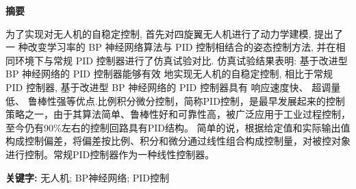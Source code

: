 \renewcommand{\abstractname}{摘要}  %
\begin{center}
   \large{\textbf{摘要}}
\end{center}
\begin{adjustwidth}{0cm}{0cm}
   \hspace{2em}为了实现对无人机的自稳定控制, 首先对四旋翼无人机进行了动力学建模, 提出了一
   种改变学习率的 BP 神经网络算法与 PID 控制相结合的姿态控制方法, 并在相同环境下与常规 PID
   控制器进行了仿真试验对比. 仿真试验结果表明: 基于改进型 BP 神经网络的 PID 控制器能够有效
   地实现无人机的自稳定控制, 相比于常规 PID 控制器, 基于改进型 BP 神经网络的 PID 控制器具有
   响应速度快、 超调量低、 鲁棒性强等优点.比例积分微分控制，简称PID控制，是最早发展起来的控制策略之一，由于其算法简单、鲁棒性好和可靠性高，被广泛应用于工业过程控制，至今仍有90\%左右的控制回路具有PID结构。
   简单的说，根据给定值和实际输出值构成控制偏差，将偏差按比例、积分和微分通过线性组合构成控制量，对被控对象进行控制。常规PID控制器作为一种线性控制器。
   
   \begin{flushleft}
   \par\textbf{关键字: } 无人机; BP神经网络; PID控制 %
   \end{flushleft}
\end{adjustwidth}
\thispagestyle{empty} %
\clearpage %

